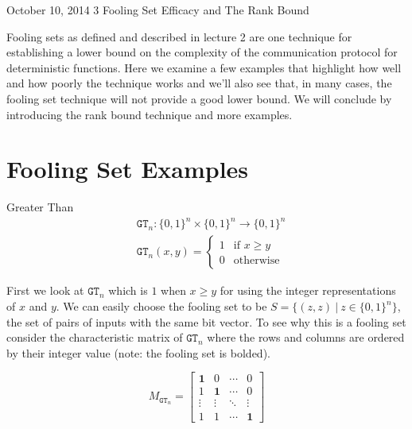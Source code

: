 \documentclass[usletter]{article}
\begin{document}
           {October 10, 2014}
           {3}
           {Fooling Set Efficacy and The Rank Bound}

\noindent

Fooling sets as defined and described in lecture 2 are one technique for establishing a lower bound on the complexity of the communication protocol for deterministic functions. Here we examine a few examples that highlight how well and how poorly the technique works and we'll also see that, in many cases, the fooling set technique will not provide a good lower bound. We will conclude by introducing the rank bound technique and more examples.

\section{Fooling Set Examples} \label{sec:fooling-set-eg}

\begin{example}
  Greater Than
  \begin{align*}
    & \mathtt{GT}_n : \{0,1\}^n \times \{0,1\}^n \rightarrow \{0,1\}^n \\
    & \mathtt{GT}_n(x,y) = \left \{
      \begin{array}{ll}
        1  & \mbox{if } x \geq y \\
        0 & \mbox{otherwise}
        \end{array}
      \right.
  \end{align*}
\end{example}

First we look at $\mathtt{GT}_n$ which is $1$ when $x \geq y$ for using the integer representations of $x$ and $y$. We can easily choose the fooling set to be $S = \{ (z, z)\ |\ z \in \{0,1\}^n \}$, the set of pairs of inputs with the same bit vector. To see why this is a fooling set consider the characteristic matrix of $\mathtt{GT}_n$ where the rows and columns are ordered by their integer value (note: the fooling set is bolded).

\begin{equation*}
  M_{\mathtt{GT}_n} =
  \begin{bmatrix}
  \textbf{1} & 0 & \cdots & 0 \\
  1 & \textbf{1} & \cdots & 0 \\
  \vdots & \vdots & \ddots & \vdots \\
  1 & 1 & \cdots & \textbf{1}
  \end{bmatrix}
\end{equation*}
\end{document}

